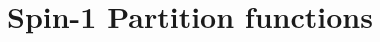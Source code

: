 \documentclass[../../PS3.tex]{subfiles}
\begin{document}
\section{Spin-1 Partition functions}
\end{document}

